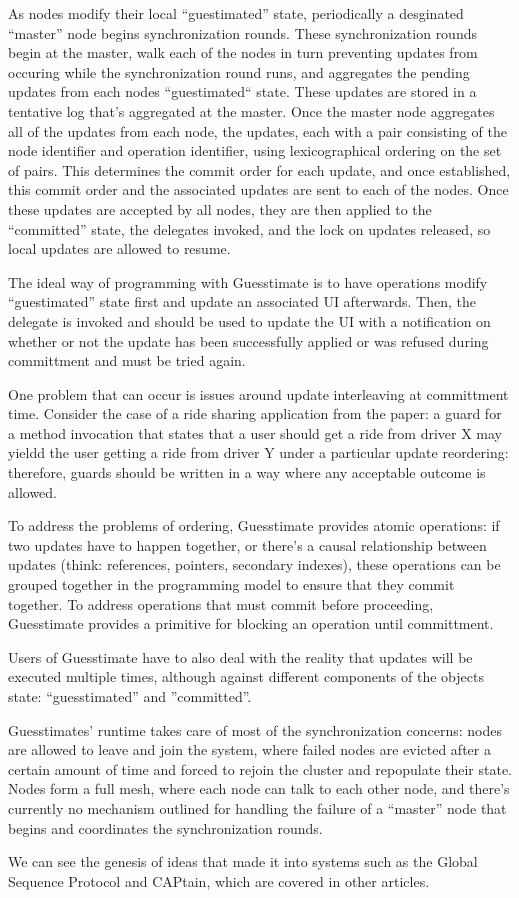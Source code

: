 As nodes modify their local ``guestimated'' state, periodically a desginated ``master'' node begins synchronization rounds.  These synchronization rounds begin at the master, walk each of the nodes in turn preventing updates from occuring while the synchronization round runs, and aggregates the pending updates from each nodes ``guestimated`` state.  These updates are stored in a tentative log that's aggregated at the master.  Once the master node aggregates all of the updates from each node, the updates, each with a pair consisting of the node identifier and operation identifier, using lexicographical ordering on the set of pairs.  This determines the commit order for each update, and once established, this commit order and the associated updates are sent to each of the nodes.  Once these updates are accepted by all nodes, they are then applied to the ``committed'' state, the delegates invoked, and the lock on updates released, so local updates are allowed to resume.

The ideal way of programming with Guesstimate is to have operations modify ``guestimated'' state first and update an associated UI afterwards.  Then, the delegate is invoked and should be used to update the UI with a notification on whether or not the update has been successfully applied or was refused during committment and must be tried again.  

One problem that can occur is issues around update interleaving at committment time.  Consider the case of a ride sharing application from the paper: a guard for a method invocation that states that a user should get a ride from driver X may yieldd the user getting a ride from driver Y under a particular update reordering: therefore, guards should be written in a way where any acceptable outcome is allowed.  

To address the problems of ordering, Guesstimate provides atomic operations: if two updates have to happen together, or there's a causal relationship between updates (think: references, pointers, secondary indexes), these operations can be grouped together in the programming model to ensure that they commit together.  To address operations that must commit before proceeding, Guesstimate provides a primitive for blocking an operation until committment.

Users of Guesstimate have to also deal with the reality that updates will be executed multiple times, although against different components of the objects state: ``guesstimated'' and ''committed''.

Guesstimates' runtime takes care of most of the synchronization concerns: nodes are allowed to leave and join the system, where failed nodes are evicted after a certain amount of time and forced to rejoin the cluster and repopulate their state.  Nodes form a full mesh, where each node can talk to each other node, and there's currently no mechanism outlined for handling the failure of a ``master'' node that begins and coordinates the synchronization rounds.  

We can see the genesis of ideas that made it into systems such as the Global Sequence Protocol and CAPtain, which are covered in other articles.
